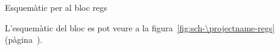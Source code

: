 \begin{contendfig}
  \begin{center}
  \end{center}
  \caption{\label{fig:sch-\projectname-regs} Esquemàtic per al bloc \textsf{regs}}
\end{contendfig}

L'esquemàtic del bloc es pot veure a la figura~\ref{fig:sch-\projectname-regs} (pàgina~\pageref{fig:sch-\projectname-regs}).


\vspace{1cm}

